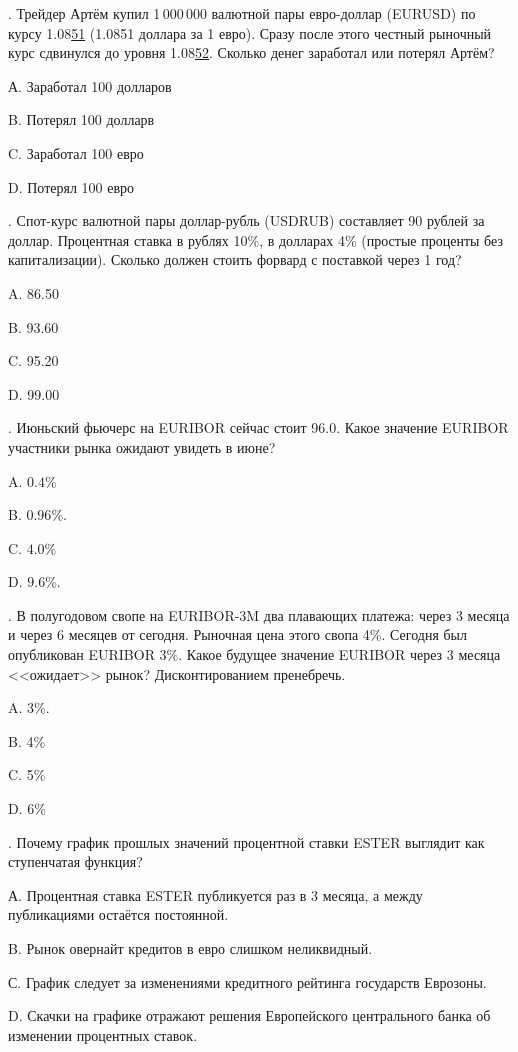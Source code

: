\documentclass[a4paper,12pt]{extarticle}
\begin{document}
\thispagestyle{empty}

. Трейдер Артём купил 1\,000\,000 валютной пары евро-доллар (EURUSD) по курсу 1.08\underline{51} (1.0851 доллара за 1 евро). Сразу после этого честный рыночный курс сдвинулся до уровня 1.08\underline{52}. Сколько денег заработал или потерял Артём?

А. Заработал 100 долларов

B. Потерял 100 долларв

C. Заработал 100 евро

D. Потерял 100 евро

\vspace{0.5cm}

. Спот-курс валютной пары доллар-рубль (USDRUB) составляет 90 рублей за доллар. Процентная ставка в рублях 10\%, в долларах 4\% (простые проценты без капитализации). Сколько должен стоить форвард с поставкой через 1 год?

A. 86.50

B. 93.60

C. 95.20

D. 99.00

\vspace{0.5cm}

. Июньский фьючерс на EURIBOR сейчас стоит 96.0. Какое значение EURIBOR 
участники рынка ожидают увидеть в июне?

A. $0.4\%$

B. $0.96\%$.

C. $4.0\%$

D. $9.6\%$.

\vspace{0.5cm}

. В полугодовом свопе на EURIBOR-3M два плавающих платежа: через 3 месяца и 
через 6 месяцев от сегодня. Рыночная цена этого свопа 4\%. Сегодня был опубликован 
EURIBOR 3\%. Какое будущее значение EURIBOR через 3 месяца <<ожидает>> рынок? 
Дисконтированием пренебречь.

A. 3\%.

B. 4\%

C. 5\%

D. 6\%

\vspace{0.5cm}

. Почему график прошлых значений процентной ставки ESTER выглядит как ступенчатая функция?

А. Процентная ставка ESTER публикуется раз в 3 месяца, а между публикациями остаётся постоянной.

B. Рынок овернайт кредитов в евро слишком неликвидный.

С. График следует за изменениями кредитного рейтинга государств Еврозоны.

D. Скачки на графике отражают решения Европейского центрального банка об изменении процентных ставок.
\end{document}
